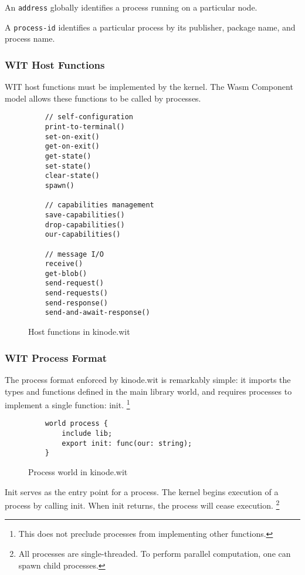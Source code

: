 \documentclass[runningheads]{llncs}
\begin{document}
An \verb|address| globally identifies a process running on a particular node.

A \verb|process-id| identifies a particular process by its publisher, package name, and process name.

\subsubsection{WIT Host Functions}

WIT host functions must be implemented by the kernel.
The Wasm Component model allows these functions to be called by processes.

\begin{figure}
    \centering
    \begin{lstlisting}
    // self-configuration
    print-to-terminal()
    set-on-exit()
    get-on-exit()
    get-state()
    set-state()
    clear-state()
    spawn()

    // capabilities management
    save-capabilities()
    drop-capabilities()
    our-capabilities()

    // message I/O
    receive()
    get-blob()
    send-request()
    send-requests()
    send-response()
    send-and-await-response()
    \end{lstlisting}
    \caption{Host functions in kinode.wit}
    \label{fig:WIT Functions}
\end{figure}

\subsubsection{WIT Process Format}

The process format enforced by kinode.wit is remarkably simple: it imports the types and functions defined in the main library world, and requires processes to implement a single function: init.
\footnote{This does not preclude processes from implementing other functions.}

\begin{figure}
    \centering
    \begin{lstlisting}
    world process {
        include lib;
        export init: func(our: string);
    }
    \end{lstlisting}
    \caption{Process world in kinode.wit}
    \label{fig:Process world}
\end{figure}

Init serves as the entry point for a process.
The kernel begins execution of a process by calling init.
When init returns, the process will cease execution.
\footnote{All processes are single-threaded. To perform parallel computation, one can spawn child processes.}
\end{document}
